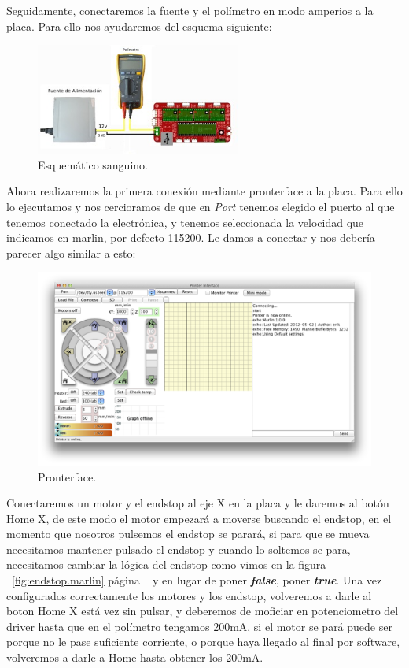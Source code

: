 			Seguidamente, conectaremos la fuente y el polímetro en modo amperios a la placa. Para ello nos ayudaremos del esquema siguiente:\\
			\begin{figure}[H]
				\centering
				\includegraphics[width=0.6\textwidth]{../../Fotos/30.jpg}
				\caption{Esquemático sanguino.}
				\label{fig:amperimetro.sanguino}
			\end {figure}
Ahora realizaremos la primera conexión mediante pronterface a la placa. Para ello lo ejecutamos y nos cercioramos de que en \emph{Port} tenemos elegido el puerto al que tenemos conectado la electrónica, y tenemos seleccionada la velocidad que indicamos en marlin, por defecto 115200. Le damos a conectar y nos debería parecer algo similar a esto:\\
\begin{figure}[H]
	\centering
	\includegraphics[width=1\textwidth]{../../Fotos/32.png}
	\caption{Pronterface.}
	\label{fig:pronterface}
\end {figure}
		Conectaremos un motor y el endstop al eje X en la placa y le daremos al botón Home X, de este modo el motor empezará a moverse buscando el endstop, en el momento que nosotros pulsemos el endstop se parará, si para que se mueva necesitamos mantener pulsado el endstop y cuando lo soltemos se para, necesitamos cambiar la lógica del endstop como vimos en la figura ~\ref{fig:endstop.marlin} página ~\pageref{fig:endstop.marlin} y en lugar de poner \textbf{\emph{false}}, poner \textbf{\emph{true}}. Una vez configurados correctamente los motores y los endstop, volveremos a darle al boton Home X está vez sin pulsar, y deberemos de moficiar en potenciometro del driver hasta que en el polímetro tengamos 200mA, si el motor se pará puede ser porque no le pase suficiente corriente, o porque haya llegado al final por software, volveremos a darle a Home hasta obtener los 200mA.\\
